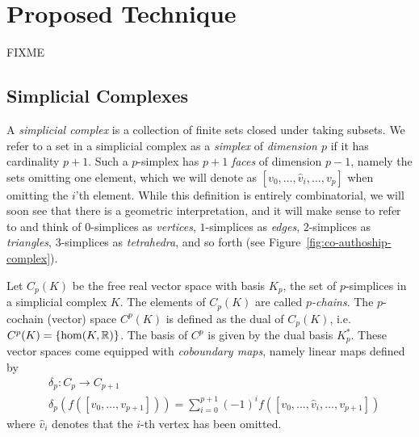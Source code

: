 \section{Proposed Technique}
FIXME

\subsection{Simplicial  Complexes}
A \emph{simplicial complex} is a collection of finite sets closed under taking subsets. We refer to a set in a simplicial complex as a \emph{simplex} of \emph{dimension $p$} if it has cardinality $p+1$. Such a $p$-simplex has $p+1$ \emph{faces} of dimension $p-1$, namely the sets omitting one element, which we will denote as $[v_0,\dotsc,\hat{v}_i,\dotsc, v_p]$ when omitting the $i$'th element. While this definition is entirely combinatorial, we will soon see that there is a geometric interpretation, and it will make sense to refer to and think of $0$-simplices as \emph{vertices}, $1$-simplices as \emph{edges}, $2$-simplices as \emph{triangles}, $3$-simplices as \emph{tetrahedra}, and so forth (see Figure~\ref{fig:co-authoship-complex}).

Let $C_p(K)$ be the free real vector space with basis $K_p$, the set of $p$-simplices in 
a simplicial complex $K$. The elements of $C_p(K)$ are called \emph{$p$-chains}. The 
$p$-cochain (vector) space $C^p(K)$ is defined as the dual of $C_p(K)$, i.e. $C^p(K)=\{\hom(K,\mathbb{R})\}$. The basis of $C^p$ is given by the dual basis $K_p^*$. These vector spaces come equipped with \emph{coboundary maps}, namely linear maps defined by
\begin{align*}
  &\delta_p:C_p\to C_{p+1} \\
  &\delta_p(f([v_0,\dotsc,v_{p+1}])) = \sum_{i=0}^{p+1} (-1)^i f([v_0,\dotsc,\hat{v}_i,\dotsc,v_{p+1}])
\end{align*}
where $\hat{v}_i$ denotes that the $i$-th vertex has been omitted. 

  
